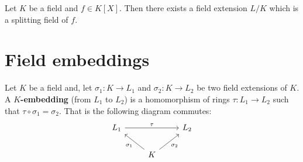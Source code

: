 \documentclass[12pt, a4paper]{article}
\begin{document}

\begin{mdprop}
    Let \(K\) be a field and \(f\in K[X]\). Then there exists a field extension \(L/K\) which is a splitting field of \(f\).
\end{mdprop}

\section{Field embeddings}

\begin{definition}
    Let \(K\) be a field and, let \(\sigma_1:K \to L_1\) and \(\sigma_2:K \to L_2\) be two field extensions of \(K\). A \textbf{\(K\)-embedding} (from \(L_1\) to \(L_2\)) is a homomorphism of rings \(\tau:L_1 \to L_2\) such that \(\tau\circ \sigma_1 =\sigma_2\). That is the following diagram commutes:
    \[\begin{tikzcd}
        {L_1} && {L_2} \\
        & K
        \arrow["{\sigma_1}", from=2-2, to=1-1]
        \arrow["\tau", from=1-1, to=1-3]
        \arrow["{\sigma_2}"', from=2-2, to=1-3]
    \end{tikzcd}\]
\end{definition}
\end{document}
